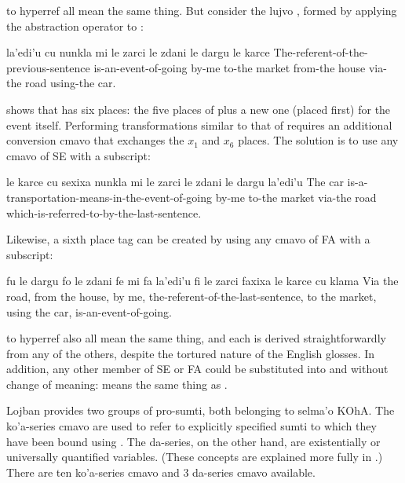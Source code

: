  to hyperref
    all mean the same thing. But consider the lujvo ,
    formed by applying the abstraction operator  to
    :
\begin{example}
la'edi'u cu nunkla\n
\T	mi le zarci le zdani\n
\T	le dargu le karce\n
The-referent-of-the-previous-sentence is-an-event-of-going\n
\T	by-me to-the market from-the house\n
\T	via-the road using-the car.
\end{example}

 shows that  has six
    places: the five places of  plus a new one (placed
    first) for the event itself. Performing transformations similar
    to that of  requires an
    additional conversion cmavo that exchanges the $x_1$ and $x_6$
    places. The solution is to use any cmavo of SE with a
    subscript:
\begin{example}
le karce cu sexixa nunkla\n
\T	mi le zarci le zdani le dargu\n
\T	la'edi'u\n
The car is-a-transportation-means-in-the-event-of-going\n
\T	by-me to-the market via-the road\n
\T	which-is-referred-to-by-the-last-sentence.
\end{example}

Likewise, a sixth place tag can be created by using any
    cmavo of FA with a subscript:
\begin{example}
fu le dargu fo le zdani fe mi\n
\T	fa la'edi'u fi le zarci\n
\T	faxixa le karce cu klama\n
Via the road, from the house, by me,\n
\T	the-referent-of-the-last-sentence, to the market,\n
\T	using the car, is-an-event-of-going.
\end{example}

 to hyperref
    also all mean the same thing, and each is derived
    straightforwardly from any of the others, despite the tortured
    nature of the English glosses. In addition, any other member of
    SE or FA could be substituted into  and 
    without change of meaning:  means the same thing as
    . 

Lojban provides two groups of pro-sumti, both belonging to
    selma'o KOhA. The ko'a-series cmavo are used to refer to
    explicitly specified sumti to which they have been bound using
    . The da-series, on the other hand, are existentially or
    universally quantified variables. (These concepts are explained
    more fully in .) There are
    ten ko'a-series cmavo and 3 da-series cmavo available.

